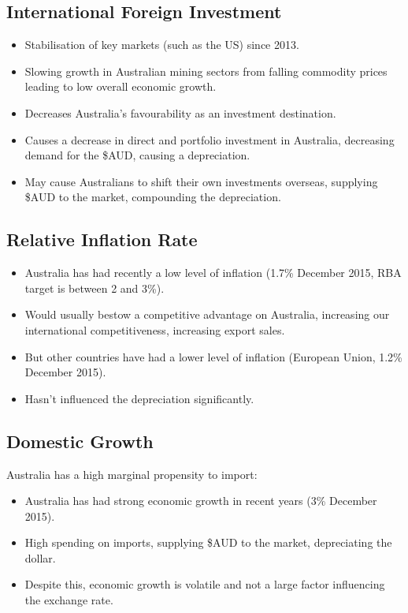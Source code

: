 \documentclass[a4paper,11pt]{report}
\begin{document}
\subsection{International Foreign Investment}

\begin{itemize}
\item Stabilisation of key markets (such as the US) since 2013.
\item Slowing growth in Australian mining sectors from falling commodity prices
	leading to low overall economic growth.
\item Decreases Australia's favourability as an investment destination.
\item Causes a decrease in direct and portfolio investment in Australia,
	decreasing demand for the \$AUD, causing a depreciation.
\item May cause Australians to shift their own investments overseas, supplying
	\$AUD to the market, compounding the depreciation.
\end{itemize}

\subsection{Relative Inflation Rate}

\begin{itemize}
\item Australia has had recently a low level of inflation (1.7\% December 2015,
	RBA target is between 2 and 3\%).
\item Would usually bestow a competitive advantage on Australia, increasing our
	international competitiveness, increasing export sales.
\item But other countries have had a lower level of inflation (European Union,
	1.2\% December 2015).
\item Hasn't influenced the depreciation significantly.
\end{itemize}

\subsection{Domestic Growth}

Australia has a high marginal propensity to import:

\begin{itemize}
\item Australia has had strong economic growth in recent years (3\% December
	2015).
\item High spending on imports, supplying \$AUD to the market, depreciating the
	dollar.
\item Despite this, economic growth is volatile and not a large factor
	influencing the exchange rate.
\end{itemize}
\end{document}
